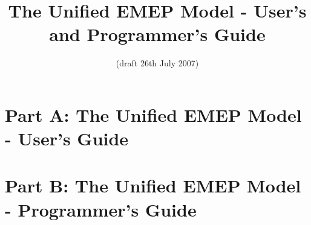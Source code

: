 \documentclass[a4paper,12pt]{report}
\begin{document}
 
\title{The Unified EMEP Model - User's and Programmer's Guide}
\date{(draft 26th July 2007)}
\maketitle

\part{Part A: The Unified EMEP Model - User's Guide}

%




\part{Part B: The Unified EMEP Model - Programmer's Guide}








%
%
%
%
%

\end{document}
